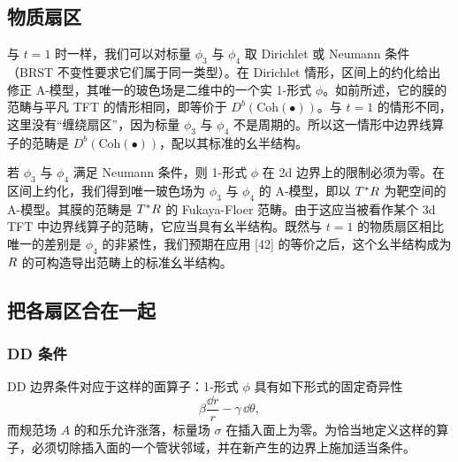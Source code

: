 \subsection{物质扇区}

与 $t=1$ 时一样，我们可以对标量 $\phi_3$ 与 $\phi_4$ 取 Dirichlet 或 Neumann 条件（BRST 不变性要求它们属于同一类型）。在 Dirichlet 情形，区间上的约化给出修正 A-模型，其唯一的玻色场是二维中的一个实 1-形式 $\phi$。如前所述，它的膜的范畴与平凡 TFT 的情形相同，即等价于 $D^b(\mathrm{Coh}(\bullet))$。与 $t=1$ 的情形不同，这里没有“缠绕扇区”，因为标量 $\phi_3$ 与 $\phi_4$ 不是周期的。所以这一情形中边界线算子的范畴是 $D^b(\mathrm{Coh}(\bullet))$，配以其标准的幺半结构。


若 $\phi_3$ 与 $\phi_4$ 满足 Neumann 条件，则 1-形式 $\phi$ 在 2d 边界上的限制必须为零。在区间上约化，我们得到唯一玻色场为 $\phi_3$ 与 $\phi_4$ 的 A-模型，即以 $T^*R$ 为靶空间的 A-模型。其膜的范畴是 $T^*R$ 的 Fukaya-Floer 范畴。由于这应当被看作某个 3d TFT 中边界线算子的范畴，它应当具有幺半结构。既然与 $t=1$ 的物质扇区相比唯一的差别是 $\phi_4$ 的非紧性，我们预期在应用 [42] 的等价之后，这个幺半结构成为 $R$ 的可构造导出范畴上的标准幺半结构。


\subsection{把各扇区合在一起}

\subsubsection{DD 条件}

DD 边界条件对应于这样的面算子：1-形式 $\phi$ 具有如下形式的固定奇异性
\[
  \beta\frac{\dd r}{r}-\gamma\,\dd\theta,
\]
而规范场 $A$ 的和乐允许涨落，标量场 $\sigma$ 在插入面上为零。为恰当地定义这样的算子，必须切除插入面的一个管状邻域，并在新产生的边界上施加适当条件。

